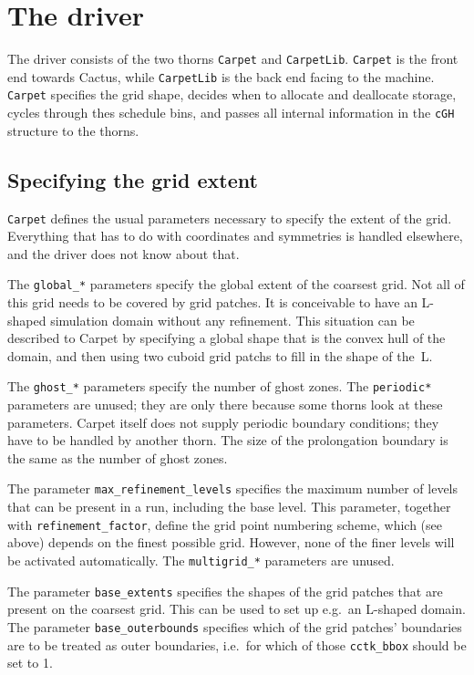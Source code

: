 \documentclass{article}
\begin{document}
\section{The driver}

   The driver consists of the two thorns \texttt{Carpet} and
   \texttt{CarpetLib}.  \texttt{Carpet} is the front end towards
   Cactus, while \texttt{CarpetLib} is the back end facing to the
   machine.  \texttt{Carpet} specifies the grid shape, decides when to
   allocate and deallocate storage, cycles through thes schedule bins,
   and passes all internal information in the \texttt{cGH} structure
   to the thorns.



\subsection{Specifying the grid extent}

   \texttt{Carpet} defines the usual parameters necessary to specify
   the extent of the grid.  Everything that has to do with coordinates
   and symmetries is handled elsewhere, and the driver does not know
   about that.

   The \texttt{global\_*} parameters specify the global extent of the
   coarsest grid.  Not all of this grid needs to be covered by grid
   patches.  It is conceivable to have an L-shaped simulation domain
   without any refinement.  This situation can be described to Carpet
   by specifying a global shape that is the convex hull of the domain,
   and then using two cuboid grid patchs to fill in the shape of
   the~L.

   The \texttt{ghost\_*} parameters specify the number of ghost zones.
   The \texttt{periodic*} parameters are unused; they are only there
   because some thorns look at these parameters.  Carpet itself does
   not supply periodic boundary conditions; they have to be handled by
   another thorn.  The size of the prolongation boundary is the same
   as the number of ghost zones.

   The parameter \texttt{max\_refinement\_levels} specifies the
   maximum number of levels that can be present in a run, including
   the base level.  This parameter, together with
   \texttt{refinement\_factor}, define the grid point numbering
   scheme, which (see above) depends on the finest possible grid.
   However, none of the finer levels will be activated automatically.
   The \texttt{multigrid\_*} parameters are unused.

   The parameter \texttt{base\_extents} specifies the shapes of the
   grid patches that are present on the coarsest grid.  This can be
   used to set up e.g.\ an L-shaped domain.  The parameter
   \texttt{base\_outerbounds} specifies which of the grid patches'
   boundaries are to be treated as outer boundaries, i.e.\ for which
   of those \texttt{cctk\_bbox} should be set to 1.
\end{document}
